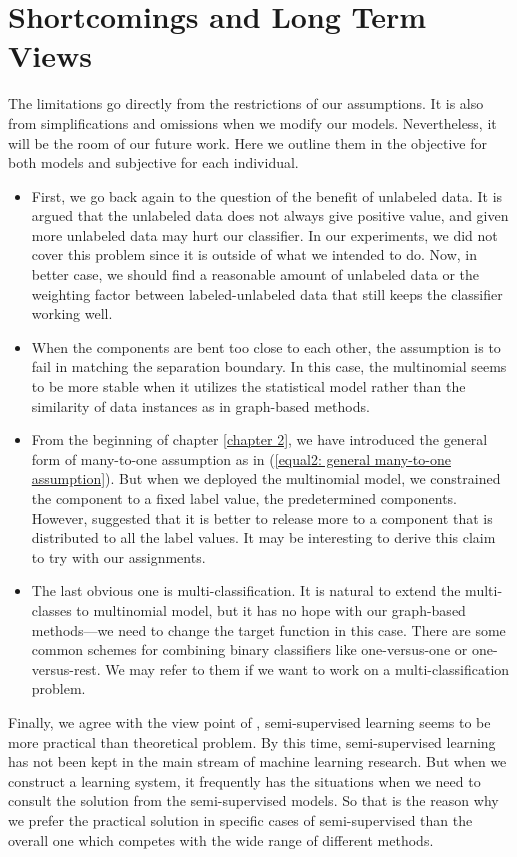 \section{Shortcomings and Long Term Views}
The limitations go directly from the restrictions of our assumptions. It is also from simplifications and omissions when we modify our models. Nevertheless, it will be the room of our future work. Here we outline them in the objective for both models and subjective for each individual.

\begin{itemize}
	\item First, we go back again to the question of the benefit of unlabeled data. It is argued that the unlabeled data does not always give positive value, and given more unlabeled data may hurt our classifier. In our experiments, we did not cover this problem since it is outside of what we intended to do. Now, in better case, we should find a reasonable amount of unlabeled data or the weighting factor between labeled-unlabeled data that still keeps the classifier working well.
	
 	\item When the components are bent too close to each other, the assumption is to fail in matching the separation boundary. In this case, the multinomial seems to be more stable when it utilizes the statistical model rather than the similarity of data instances as in graph-based methods.
	
	\item From the beginning of chapter \ref{chapter 2}, we have introduced the general form of many-to-one assumption as in (\ref{equal2: general many-to-one assumption}). But when we deployed the multinomial model, we constrained the component to a fixed label value, the predetermined components. However, \citeauthor{NIPS1996_1208} \parencite{NIPS1996_1208} suggested that it is better to release more to a component that is distributed to all the label values. It may be interesting to derive this claim to try with our assignments.
	
	\item The last obvious one is multi-classification. It is natural to extend the multi-classes to multinomial model, but it has no hope with our graph-based methods---we need to change the target function in this case. There are some common schemes for combining binary classifiers like one-versus-one or one-versus-rest. We may refer to them if we want to work on a multi-classification problem.
\end{itemize}

Finally, we agree with the view point of \citeauthor{Olivier2006} \parencite{Olivier2006}, semi-supervised learning seems to be more practical than theoretical problem. By this time, semi-supervised learning has not been kept in the main stream of machine learning research. But when we construct a learning system, it frequently has the situations when we need to consult the solution from the semi-supervised models. So that is the reason why we prefer the practical solution in specific cases of semi-supervised than the overall one which competes with the wide range of different methods.